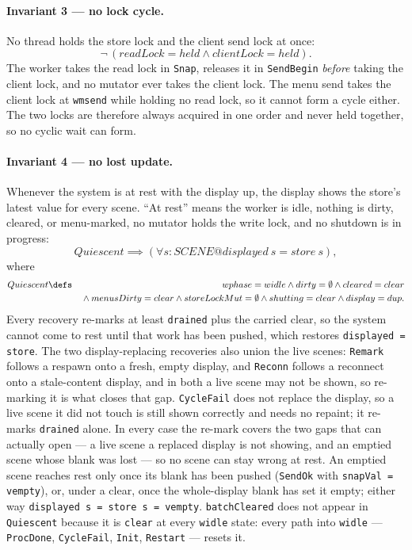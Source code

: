 \documentclass[a4paper,10pt,fleqn]{article}
\begin{document}
\paragraph{Invariant 3 --- no lock cycle.}
No thread holds the store lock and the client send lock at once:
\[
  \lnot\,(readLock = held \land clientLock = held).
\]
The worker takes the read lock in \texttt{Snap}, releases it in
\texttt{SendBegin} \emph{before} taking the client lock, and no mutator
ever takes the client lock.  The menu send takes the client lock at
\texttt{wmsend} while holding no read lock, so it cannot form a cycle
either.  The two locks are therefore always acquired in one order and never
held together, so no cyclic wait can form.

\paragraph{Invariant 4 --- no lost update.}
Whenever the system is at rest with the display up, the display shows the
store's latest value for every scene.  ``At rest'' means the worker is
idle, nothing is dirty, cleared, or menu-marked, no mutator holds the write
lock, and no shutdown is in progress:
\[
  Quiescent \implies (\forall s : SCENE @ displayed~s = store~s),
\]
where
\begin{eqnarray*}
  Quiescent & \defs & wphase = widle \land dirty = \emptyset \land
    cleared = clear \\
  & & {} \land menusDirty = clear \land storeLockMut = \emptyset \land
    shutting = clear \land display = dup.
\end{eqnarray*}
Every recovery re-marks at least \texttt{drained} plus the carried clear, so
the system cannot come to rest until that work has been pushed, which restores
\texttt{displayed = store}.  The two display-replacing recoveries also union
the live scenes: \texttt{Remark} follows a respawn onto a fresh, empty
display, and \texttt{Reconn} follows a reconnect onto a stale-content display,
and in both a live scene may not be shown, so re-marking it is what closes
that gap.  \texttt{CycleFail} does not replace the display, so a live scene it
did not touch is still shown correctly and needs no repaint; it re-marks
\texttt{drained} alone.  In every case the re-mark covers the two gaps that
can actually open --- a live scene a replaced display is not showing, and an
emptied scene whose blank was lost --- so no scene can stay wrong at rest.  An emptied scene reaches rest only once its blank has
been pushed (\texttt{SendOk} with \texttt{snapVal = vempty}), or, under a
clear, once the whole-display blank has set it empty; either way
\texttt{displayed~s = store~s = vempty}.  \texttt{batchCleared} does not
appear in \texttt{Quiescent} because it is \texttt{clear} at every
\texttt{widle} state: every path into \texttt{widle} --- \texttt{ProcDone},
\texttt{CycleFail}, \texttt{Init}, \texttt{Restart} --- resets it.
\end{document}
